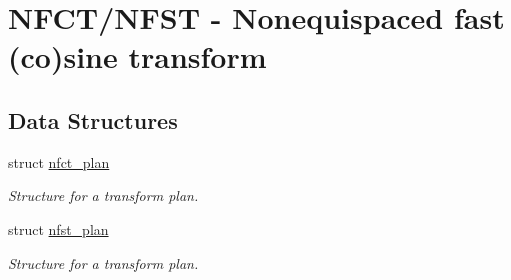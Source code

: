 \hypertarget{group__nfsct}{
\section{NFCT/NFST - Nonequispaced fast (co)sine transform}
\label{group__nfsct}
}
\subsection*{Data Structures}
\begin{CompactItemize}
\item 
struct \hyperlink{structnfct__plan}{nfct\_\-plan}
\begin{CompactList}\small\item\em Structure for a transform plan. \item\end{CompactList}\item 
struct \hyperlink{structnfst__plan}{nfst\_\-plan}
\begin{CompactList}\small\item\em Structure for a transform plan. \item\end{CompactList}\end{CompactItemize}
